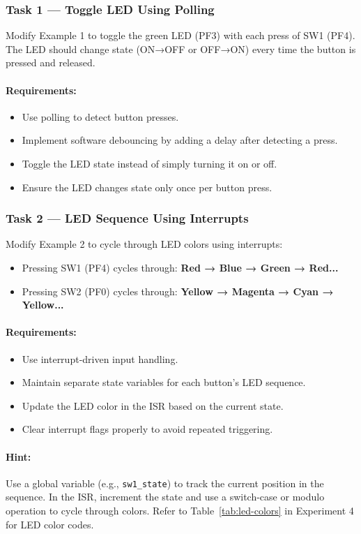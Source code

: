 \subsubsection{Task 1 — Toggle LED Using Polling}

Modify Example 1 to toggle the green LED (PF3) with each press of SW1 (PF4). The LED should change state (ON→OFF or OFF→ON) every time the button is pressed and released.

\paragraph{Requirements:}
\begin{itemize}[nosep]
  \item Use polling to detect button presses.
  \item Implement software debouncing by adding a delay after detecting a press.
  \item Toggle the LED state instead of simply turning it on or off.
  \item Ensure the LED changes state only once per button press.
\end{itemize}

\medskip


\subsubsection{Task 2 — LED Sequence Using Interrupts}

Modify Example 2 to cycle through LED colors using interrupts:
\begin{itemize}[nosep]
  \item Pressing SW1 (PF4) cycles through: \textbf{Red → Blue → Green → Red...}
  \item Pressing SW2 (PF0) cycles through: \textbf{Yellow → Magenta → Cyan → Yellow...}
\end{itemize}

\paragraph{Requirements:}
\begin{itemize}[nosep]
  \item Use interrupt-driven input handling.
  \item Maintain separate state variables for each button's LED sequence.
  \item Update the LED color in the ISR based on the current state.
  \item Clear interrupt flags properly to avoid repeated triggering.
\end{itemize}

\paragraph{Hint:}
Use a global variable (e.g., \texttt{sw1\_state}) to track the current position in the sequence. In the ISR, increment the state and use a switch-case or modulo operation to cycle through colors. Refer to Table~\ref{tab:led-colors} in Experiment 4 for LED color codes.